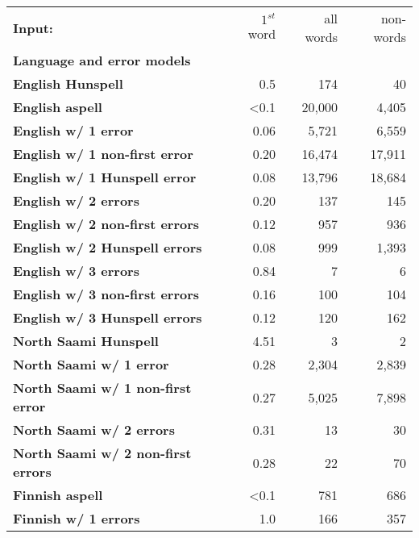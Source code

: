 \documentclass[a4paper,12pt]{article}
\begin{document}
\begin{table}
    \centering
    \begin{tabular}{|l|r|r|r|}
        \hline
        \bf Input: & $1^{st}$ word & all words & non-words \\
        \bf Language and error models & & & \\
        \hline
        \bf English Hunspell & 0.5 & 174 & 40 \\
          \bf English aspell & <0.1 & 20,000 & 4,405 \\
        \hline
        \bf English w/ 1 error & 0.06 & 5,721 & 6,559 \\
 \bf English w/ 1 non-first error & 0.20 & 16,474 & 17,911 \\
 \bf English w/ 1 Hunspell error & 0.08 & 13,796 & 18,684 \\
     \bf English w/ 2 errors & 0.20 & 137 & 145 \\
 \bf English w/ 2 non-first errors & 0.12 & 957 & 936 \\
 \bf English w/ 2 Hunspell errors & 0.08 & 999 & 1,393 \\
   \bf English w/ 3 errors & 0.84 & 7 & 6 \\
 \bf English w/ 3 non-first errors & 0.16 & 100 & 104 \\
 \bf English w/ 3 Hunspell errors & 0.12 & 120 & 162 \\
        \hline
   \bf North Saami Hunspell & 4.51 & 3 & 2 \\
        \hline
        \bf North Saami w/ 1 error & 0.28 & 2,304 & 2,839 \\
\bf North Saami w/ 1 non-first error & 0.27 & 5,025 & 7,898 \\
       \bf North Saami w/ 2 errors & 0.31 & 13 & 30 \\
\bf North Saami w/ 2 non-first errors & 0.28 & 22 & 70 \\
        \hline
        \bf Finnish aspell & <0.1 & 781 & 686 \\
        \hline
        \bf Finnish w/ 1 errors & 1.0 & 166 & 357 \\

\end{tabular}
\end{table}
\end{document}
